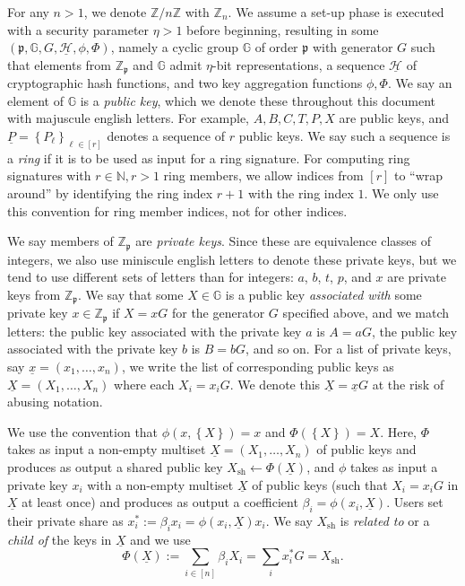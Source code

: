 \documentclass{iacrtrans}
\theoremstyle{definition}
\numberwithin{theorem}{subsection}
\numberwithin{lemma}{theorem}
\newcommand{\scalarField}{\mathbb{Z}_{\mathfrak{p}}}
\newcommand{\group}{\mathbb{G}}
\newcommand{\p}{\mathfrak{p}}
\newcommand{\bbz}{\mathbb{Z}}
\newcommand{\bbn}{\mathbb{N}}
\begin{document}
For any $n > 1$, we denote $\bbz/n\bbz$ with $\bbz_n$. We assume a set-up phase is executed with a security parameter $\eta > 1$ before beginning, resulting in some $(\p, \group, G, \underline{\mathcal{H}}, \phi, \Phi)$, namely a cyclic group $\group$ of order $\p$ with generator $G$ such that elements from $\bbz_\p$ and $\mathbb{G}$ admit $\eta$-bit representations, a sequence $\underline{\mathcal{H}}$ of cryptographic hash functions, and two key aggregation functions $\phi, \Phi$. We say an element of $\group$ is a \textit{public key}, which we denote these throughout this document with majuscule english letters. For example, $A, B, C, T, P, X$ are public keys, and $\underline{P} = \left\{P_\ell \right\}_{\ell \in [r]}$ denotes a sequence of $r$ public keys.  We say such a sequence is a \textit{ring} if it is to be used as input for a ring signature. For computing ring signatures with $r \in \bbn, r > 1$ ring members, we allow indices from $[r]$ to ``wrap around'' by identifying the ring index $r+1$ with the ring index $1$. We only use this convention for ring member indices, not for other indices. 

We say members of $\scalarField$ are \textit{private keys}. Since these are equivalence classes of integers, we also use miniscule english letters to denote these private keys, but we tend to use different sets of letters than for integers: $a$, $b$, $t$, $p$, and $x$ are private keys from $\scalarField$. We say that some $X \in \group$ is a public key \textit{associated with} some private key $x \in \scalarField$ if $X = xG$ for the generator $G$ specified above, and we match letters: the public key associated with the private key $a$ is $A = aG$, the public key associated with the private key $b$ is $B = bG$, and so on. For a list of private keys, say $\underline{x} =  (x_1, \ldots, x_n)$, we write the list of corresponding public keys as $\underline{X} = (X_1, \ldots, X_n)$ where each $X_i = x_i G$. We denote this $\underline{X} = \underline{x}G$ at the risk of abusing notation. 

We use the convention that $\phi(x, \left\{X\right\}) = x$ and $\Phi(\left\{X\right\}) = X$. Here, $\Phi$ takes as input a non-empty multiset $\underline{X} = (X_1, \ldots, X_n)$ of public keys and produces as output a shared public key $X_{\text{sh}} \leftarrow \Phi(\underline{X})$, and $\phi$ takes as input a private key $x_i$ with a non-empty multiset $\underline{X}$ of public keys (such that $X_i = x_iG$ in $\underline{X}$ at least once) and produces as output a coefficient $\beta_i = \phi(x_i, \underline{X})$. Users set their private share as $x_i^* := \beta_i x_i = \phi(x_i, \underline{X}) x_i$. We say $X_{\text{sh}}$ is \textit{related to} or a \textit{child of} the keys in $\underline{X}$ and we use \[\Phi(\underline{X}) := \sum_{i \in [n]} \beta_i X_i = \sum_i x_i^* G = X_{\text{sh}}.\]
\end{document}
